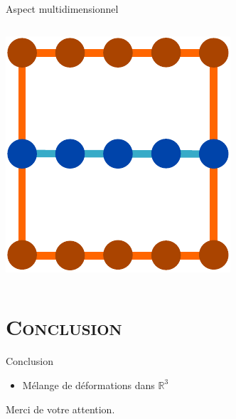 \documentclass[xcolor=x11names,compress]{beamer}
\renewcommand{\(}{\begin{columns}} \renewcommand{\)}{\end{columns}}
\newcommand{\<}[1]{\begin{column}{#1}} \renewcommand{\>}{\end{column}}
\begin{document}
\begin{frame}{Aspect multidimensionnel}
\begin{columns}[t]
\begin{column}{0.3\textwidth}
      \includegraphics[scale=0.4]{OutilCourbe10}
    \end{column}
  \end{columns}
\end{frame}


\section{\scshape Conclusion}

\begin{frame}{Conclusion}
  \begin{itemize}
    \item Mélange de déformations dans $\mathbb{R}^3$
  \end{itemize}
\end{frame}

\begin{frame}{}
\begin{center}
\huge Merci de votre attention.
\end{center}
\end{frame}

\appendix
\end{document}
